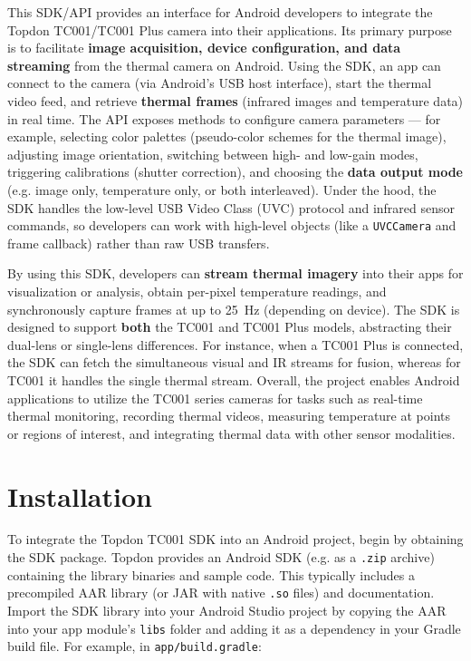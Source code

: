 This SDK/API provides an interface for Android developers to integrate
the Topdon TC001/TC001 Plus camera into their applications. Its primary
purpose is to facilitate \textbf{image acquisition, device configuration, and
data streaming} from the thermal camera on Android. Using the SDK, an
app can connect to the camera (via Android's USB host interface), start
the thermal video feed, and retrieve \textbf{thermal frames} (infrared images
and temperature data) in real time. The API exposes methods to configure
camera parameters --- for example, selecting color palettes (pseudo-color
schemes for the thermal image), adjusting image orientation, switching
between high- and low-gain modes, triggering calibrations (shutter
correction), and choosing the \textbf{data output mode} (e.g. image only,
temperature only, or both interleaved). Under the hood, the SDK handles
the low-level USB Video Class (UVC) protocol and infrared sensor
commands, so developers can work with high-level objects (like a
\texttt{UVCCamera} and frame callback) rather than raw USB transfers.

By using this SDK, developers can \textbf{stream thermal imagery} into their
apps for visualization or analysis, obtain per-pixel temperature
readings, and synchronously capture frames at up to 25 Hz (depending on
device)\cite{SamsungHealth2020}.
The SDK is designed to support \textbf{both} the TC001 and TC001 Plus models,
abstracting their dual-lens or single-lens differences. For instance,
when a TC001 Plus is connected, the SDK can fetch the simultaneous
visual and IR streams for fusion, whereas for TC001 it handles the
single thermal stream. Overall, the project enables Android applications
to utilize the TC001 series cameras for tasks such as real-time thermal
monitoring, recording thermal videos, measuring temperature at points or
regions of interest, and integrating thermal data with other sensor
modalities.

\section{Installation}

To integrate the Topdon TC001 SDK into an Android project, begin by
obtaining the SDK package. Topdon provides an Android SDK (e.g. as a
\texttt{.zip} archive) containing the library binaries and sample
code\cite{WHOStressDefinition}.
This typically includes a precompiled AAR library (or JAR with native
\texttt{.so} files) and documentation. Import the SDK library into your Android
Studio project by copying the AAR into your app module's \texttt{libs} folder
and adding it as a dependency in your Gradle build file. For example, in
\texttt{app/build.gradle}:

